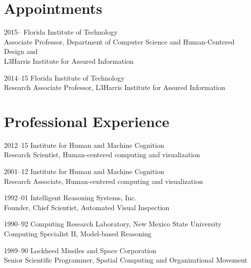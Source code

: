 \documentclass[12pt,letterpaper]{report}
\begin{document}
    \section*{Appointments}

    \begin{tablist}

        \item[2015--]   \tab{}Florida Institute of Technology \\
                              Associate Professor, Department of Computer Science and Human-Centered Design and\\
                              L3Harris Institute for Assured Information

        \item[2014--15]   \tab{}Florida Institute of Technology \\
                              Research Associate Professor, L3Harris Institute for Assured Information
                              
    \end{tablist}

    \section*{Professional Experience}

    \begin{tablist}

        \item[2012--15]   \tab{}Institute for Human and Machine Cognition\\
                              Research Scientist, Human-centered computing and visualization

        \item[2001--12]   \tab{}Institute for Human and Machine Cognition\\
                              Research Associate, Human-centered computing and visualization
                              
        \item[1992--01]\tab{}Intelligent Reasoning Systems, Inc.\\
                              Founder, Chief Scientist, Automated Visual Inspection
 
         \item[1990--92]\tab{}Computing Research Laboratory, New Mexico State University\\
                              Computing Specialist II, Model-based Reasoning
                              
        \item[1989--90]\tab{}Lockheed Missiles and Space Corporation\\
                              Senior Scientific Programmer, Spatial Computing and Organizational Movement
    \end{tablist}
\end{document}
